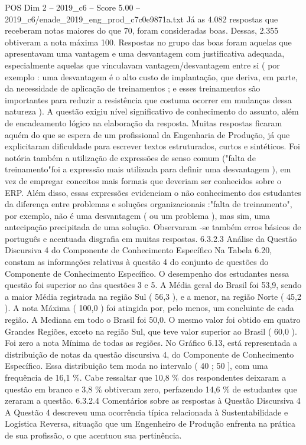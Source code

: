 \begin{textsample}{POS Dim 2 – 2019\_c6 – Score 5.00 – 2019\_c6/enade\_2019\_eng\_prod\_c7c0e9871a.txt}
Já as 4.082 respostas que receberam notas maiores do que 70, foram consideradas boas.
Dessas, 2.355 obtiveram a nota máxima 100.
Respostas no grupo das boas foram aquelas que apresentavam uma vantagem e uma desvantagem com justificativa adequada, especialmente aquelas que vinculavam vantagem/desvantagem entre si ( por exemplo : uma desvantagem é o alto custo de implantação, que deriva, em parte, da necessidade de aplicação de treinamentos ; e esses treinamentos são importantes para reduzir a resistência que costuma ocorrer em mudanças dessa natureza ).
A questão exigiu nível significativo de conhecimento do assunto, além de encadeamento lógico na elaboração da resposta.
Muitas respostas ficaram aquém do que se espera de um profissional da Engenharia de Produção, já que explicitaram dificuldade para escrever textos estruturados, curtos e sintéticos.
Foi notória também a utilização de expressões de senso comum ("falta de treinamento"foi a expressão mais utilizada para definir uma desvantagem ), em vez de empregar conceitos mais formais que deveriam ser conhecidos sobre o ERP.
Além disso, essas expressões evidenciam o não conhecimento dos estudantes da diferença entre problemas e soluções organizacionais :"falta de treinamento", por exemplo, não é uma desvantagem ( ou um problema ), mas sim, uma antecipação precipitada de uma solução.
Observaram -se também erros básicos de português e acentuada disgrafia em muitas respostas. 6.3.2.3 Análise da Questão Discursiva 4 do Componente de Conhecimento Específico Na Tabela 6.20, constam as informações relativas à questão 4 do conjunto de questões do Componente de Conhecimento Específico.
O desempenho dos estudantes nessa questão foi superior ao das questões 3 e 5.
A Média geral do Brasil foi 53,9, sendo a maior Média registrada na região Sul ( 56,3 ), e a menor, na região Norte ( 45,2 ).
A nota Máxima ( 100,0 ) foi atingida por, pelo menos, um concluinte de cada região.
A Mediana em todo o Brasil foi 50,0.
O mesmo valor foi obtido em quatro Grandes Regiões, exceto na região Sul, que teve valor superior ao Brasil ( 60,0 ).
Foi zero a nota Mínima de todas as regiões.
No Gráfico 6.13, está representada a distribuição de notas da questão discursiva 4, do Componente de Conhecimento Específico.
Essa distribuição tem moda no intervalo ( 40 ; 50 ], com uma frequência de 16,1 \%.
Cabe ressaltar que 10,8 \% dos respondentes deixaram a questão em branco e 3,8 \% obtiveram zero, perfazendo 14,6 \% de estudantes que zeraram a questão. 6.3.2.4 Comentários sobre as respostas à Questão Discursiva 4 A Questão 4 descreveu uma ocorrência típica relacionada à Sustentabilidade e Logística Reversa, situação que um Engenheiro de Produção enfrenta na prática de sua profissão, o que acentuou sua pertinência.

\end{textsample}
